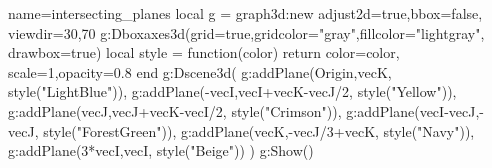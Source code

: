 \documentclass[border=5pt]{standalone}%
\begin{document}
\begin{luadraw}{name=intersecting_planes}
local g = graph3d:new{ adjust2d=true,bbox=false, viewdir={30,70} }
g:Dboxaxes3d({grid=true,gridcolor="gray",fillcolor="lightgray", drawbox=true})
local style = function(color)
    return {color=color, scale=1,opacity=0.8}
end
g:Dscene3d(
    g:addPlane({Origin,vecK}, style("LightBlue")),
    g:addPlane({-vecI,vecI+vecK-vecJ/2}, style("Yellow")),
    g:addPlane({vecJ,vecJ+vecK-vecI/2}, style("Crimson")),
    g:addPlane({vecI-vecJ,-vecJ}, style("ForestGreen")),
    g:addPlane({vecK,-vecJ/3+vecK}, style("Navy")),
    g:addPlane({3*vecI,vecI}, style("Beige"))
)
g:Show()
\end{luadraw}
\end{document}

